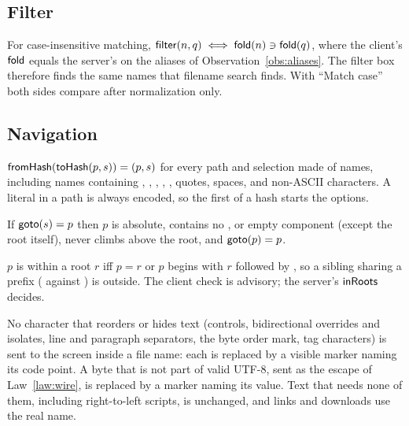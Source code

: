 \subsection{Filter}

\begin{law}
\label{law:filter}
For case-insensitive matching, $\mathsf{filter}(n,q)\iff \mathsf{fold}(n)\ni\mathsf{fold}(q)$, where the
client's $\mathsf{fold}$ equals the server's on the aliases of Observation~\ref{obs:aliases}.
The filter box therefore finds the same names that filename search finds.  With
``Match case'' both sides compare after normalization only.
\end{law}

\subsection{Navigation}

\begin{law}
\label{law:hash}
$\mathsf{fromHash}(\mathsf{toHash}(p,s))=(p,s)$ for every path and selection made of names,
including names containing \code{\%}, \code{\#}, , \code{\&}, \code{=},
quotes, spaces, and non-ASCII characters.  A literal  in a path is always
encoded, so the first  of a hash starts the options.
\end{law}

\begin{law}
\label{law:goto}
If $\mathsf{goto}(s)=p$ then $p$ is absolute, contains no ,  or empty
component (except the root itself), never climbs above the root, and
$\mathsf{goto}(p)=p$.
\end{law}

\begin{law}
\label{law:roots-prefix}
$p$ is within a root $r$ iff $p=r$ or $p$ begins with $r$ followed by \code{/},
so a sibling sharing a prefix ( against ) is
outside.  The client check is advisory; the server's $\mathsf{inRoots}$ decides.
\end{law}

\begin{law}
\label{law:display}
No character that reorders or hides text (controls, bidirectional overrides and
isolates, line and paragraph separators, the byte order mark, tag characters) is
sent to the screen inside a file name: each is replaced by a visible marker naming
its code point.  A byte that is not part of valid UTF-8, sent as the escape of
Law~\ref{law:wire}, is replaced by a marker naming its value.  Text that needs none
of them, including right-to-left scripts, is unchanged, and links and downloads use
the real name.
\end{law}

